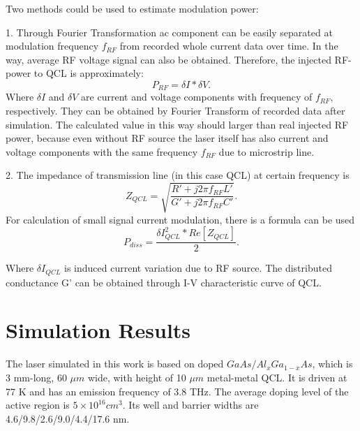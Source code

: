 \documentclass[11pt,final]{scrbook}
\begin{document}
Two methods could be used to estimate modulation power:

1. Through Fourier Transformation ac component can be easily separated at modulation frequency $f_{RF}$ from recorded whole current data over time. In the way, average RF voltage signal can also be obtained. Therefore, the injected RF-power to QCL is approximately:
\begin{equation}
 P_{RF}=\delta I* \delta V.
 \end{equation}
Where $\delta I$ and $ \delta V$ are current and voltage components with frequency of $f_{RF}$, respectively. They can be obtained by Fourier Transform of recorded data after simulation. The calculated value in this way should larger than real injected RF power, because even without RF source the laser itself has also current and voltage components with the same frequency $f_{RF}$ due to microstrip line.

2. The impedance of transmission line (in this case QCL) at certain frequency is 
\begin{equation}
Z_{QCL}=\sqrt{\frac{R'+j2\pi f_{RF}L'}{G'+j2\pi f_{RF}C'}}.
\end{equation}
For calculation of small signal current modulation, there is a formula \cite{ramo2008fields} can be used 
\begin{equation}
{ P }_{ diss }=\frac { \delta { I }_{ QCL }^{ 2 }*Re[{ Z }_{ QCL }] }{ 2 }.
\end{equation}

Where $\delta { I }_{ QCL }$ is induced current variation due to RF source. The distributed conductance G' can be obtained through I-V characteristic curve of QCL.

\chapter{Simulation Results}
The laser simulated in this work is based on doped $GaAs/Al_{x}Ga_{1-x}As$, which is 3 mm-long, 60 $\mu m$ wide, with height of 10 $\mu m$ metal-metal QCL. It is driven at 77 K and has an emission frequency of 3.8 THz. The average doping level of the active region is $5\times 10^{16} cm^{3}$. Its well and barrier widths are 4.6/9.8/2.6/9.0/4.4/17.6 nm.
\end{document}
